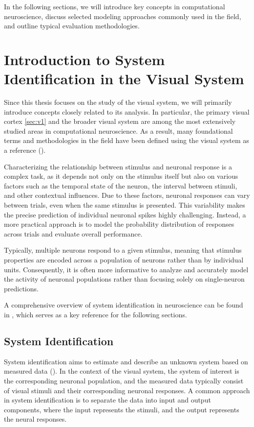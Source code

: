In the following sections, we will introduce key concepts in computational neuroscience, discuss selected modeling approaches commonly used in the field, and outline typical evaluation methodologies.

\section{Introduction to System Identification in the Visual System}
\label{sec:system_identification}

Since this thesis focuses on the study of the visual system, we will primarily introduce concepts closely related to its analysis. In particular, the primary visual cortex \ref{sec:v1} and the broader visual system are among the most extensively studied areas in computational neuroscience. As a result, many foundational terms and methodologies in the field have been defined using the visual system as a reference (\citet{dayan2005theoretical}).

Characterizing the relationship between stimulus and neuronal response is a complex task, as it depends not only on the stimulus itself but also on various factors such as the temporal state of the neuron, the interval between stimuli, and other contextual influences. Due to these factors, neuronal responses can vary between trials, even when the same stimulus is presented. This variability makes the precise prediction of individual neuronal spikes highly challenging. Instead, a more practical approach is to model the probability distribution of responses across trials and evaluate overall performance.

Typically, multiple neurons respond to a given stimulus, meaning that stimulus properties are encoded across a population of neurons rather than by individual units. Consequently, it is often more informative to analyze and accurately model the activity of neuronal populations rather than focusing solely on single-neuron predictions.

A comprehensive overview of system identification in neuroscience can be found in \citet{annurev:/content/journals/10.1146/annurev-vision-091718-014731}, which serves as a key reference for the following sections.

\subsection{System Identification}
\label{subsec:system_identification}

System identification aims to estimate and describe an unknown system based on measured data (\citet{annurev:/content/journals/10.1146/annurev-vision-091718-014731}). In the context of the visual system, the system of interest is the corresponding neuronal population, and the measured data typically consist of visual stimuli and their corresponding neuronal responses. A common approach in system identification is to separate the data into input and output components, where the input represents the stimuli, and the output represents the neural responses.

